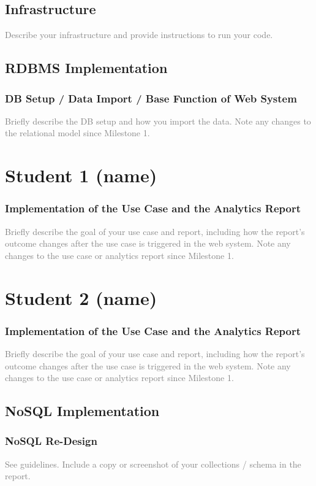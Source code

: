 \documentclass[a4paper, 11pt]{article}          %
\begin{document}
\subsection{Infrastructure}
\textcolor{gray}{Describe your infrastructure and provide instructions to run your code.}
\subsection{RDBMS Implementation}
\subsubsection{DB Setup / Data Import / Base Function of Web System}
\textcolor{gray}{Briefly describe the DB setup and how you import the data. Note any changes to the relational model since Milestone 1.}

\section*{Student 1 (name)}
\subsubsection{Implementation of the Use Case and the Analytics Report}
\textcolor{gray}{
Briefly describe the goal of your use case and report, including how the report’s outcome changes after the use case is triggered in the web system. Note any changes to the use case or analytics report since Milestone 1.
}


\section*{Student 2 (name)}
\setcounter{subsubsection}{1}
\subsubsection{Implementation of the Use Case and the Analytics Report}
\textcolor{gray}{
Briefly describe the goal of your use case and report, including how the report’s outcome changes after the use case is triggered in the web system. Note any changes to the use case or analytics report since Milestone 1.
}
\pagebreak

\subsection{NoSQL Implementation}

\subsubsection{NoSQL Re-Design}
\textcolor{gray}{
See guidelines. Include a copy or screenshot of your collections / schema in the report.
}
\end{document}

